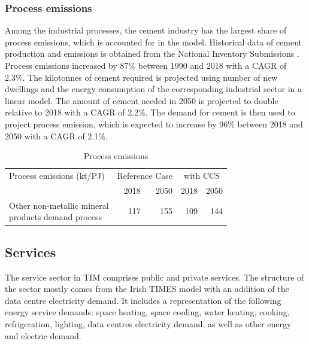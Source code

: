 \documentclass[gmd,manuscript]{copernicus}
\begin{document}
\subsubsection{Process emissions}
Among the industrial processes, the cement industry has the largest share of process emissions, which is accounted for in the model. Historical data of cement production and emissions is obtained from the National Inventory Submissions \citep{NIR2020E91:online}. Process emissions increased by 87\% between 1990 and 2018 with a CAGR of 2.3\%. The kilotonnes of cement required is projected using number of new dwellings and the energy consumption of the corresponding industrial sector in a linear model. The amount of cement needed in 2050 is projected to double relative to 2018 with a CAGR of 2.2\%. The demand for cement is then used to project process emission, which is expected to increase by 96\% between 2018 and 2050 with a CAGR of 2.1\%. 

\begin{table}[htbp]
\footnotesize
 \centering
 \caption{Process emissions}
 \begin{tabular}{lrrrr}
 \hline
 Process emissions (kt/PJ) & \multicolumn{2}{c}{Reference Case} & \multicolumn{2}{c}{with CCS} \\
 & 2018 & 2050 & 2018 & 2050 \\ \hline
 \makecell{Other non-metallic mineral \\ products demand process} & 117 & 155 & 109 & 144 \\ \hline
 \end{tabular}%
 \label{table: process emissions}%
\end{table}%


\subsection{Services}
\label{ss:services}
The service sector in TIM comprises public and private services. The structure of the sector mostly comes from the Irish TIMES model with an addition of the data centre electricity demand. It includes a representation of the following energy service demands: space heating, space cooling, water heating, cooking, refrigeration, lighting, data centres electricity demand, as well as other energy and electric demand.

\end{document}
